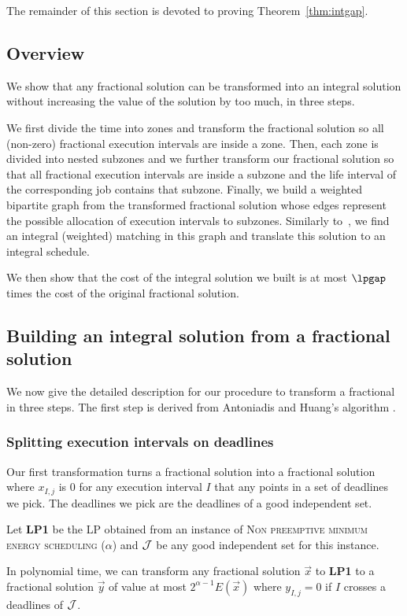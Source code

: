 The remainder of this section is devoted to proving Theorem~\ref{thm:intgap}.

\subsection{Overview}

We show that any fractional solution can be transformed into an integral solution without increasing the value of the solution by too much, in three steps. 

We first divide the time into zones and transform the fractional solution so all (non-zero) fractional execution intervals are inside a zone. Then, each zone is divided into nested subzones and we further transform our fractional solution so that all fractional execution intervals are inside a subzone and the life interval of the corresponding job contains that subzone. Finally, we build a weighted bipartite graph from the transformed fractional solution whose edges represent the possible allocation of execution intervals to subzones. Similarly to~\cite{Shmoys_Tardos}, we find an integral (weighted) matching in this graph and translate this solution to an integral schedule.

We then show that the cost of the integral solution we built is at most $\lpgap$ times the cost of the original fractional solution.



\subsection{Building an integral solution from a fractional solution}

We now give the detailed description for our procedure to transform a fractional in three steps. The first step is derived from Antoniadis and Huang's algorithm \cite{Antoniadis_Huang}. 

\subsubsection{Splitting execution intervals on deadlines}

Our first transformation turns a fractional solution into a fractional solution where $x_{I,j}$ is 0 for any execution interval $I$ that any points in a set of deadlines we pick. The deadlines we pick are the deadlines of a good independent set.

\begin{lem}\label{lem:deadline_zones}
  Let \textbf{LP1} be the LP obtained from an instance of \textsc{Non preemptive minimum energy scheduling ($\alpha$)} and $\cal{J}$ be any good independent set for this instance.

  In polynomial time, we can transform any fractional solution $\vec{x}$ to \textbf{LP1} to a fractional solution $\vec{y}$ of value at most $2^{\alpha-1}E(\vec{x})$ where $y_{I,j}=0$ if $I$ crosses a deadlines of $\cal{J}$.
\end{lem}


